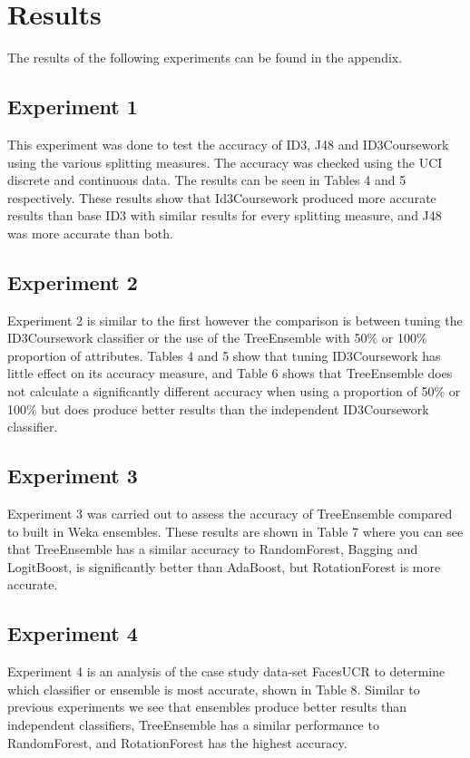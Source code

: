 \documentclass{cmppgr}
\begin{document}
\section {Results} 
The results of the following experiments can be found in the appendix. 

\subsection{Experiment 1}
This experiment was done to test the accuracy of ID3, J48 and ID3Coursework 
using the various splitting measures. The accuracy was checked using the 
UCI discrete and continuous data. The results can be seen in Tables 4 and 5 
respectively. These results show that Id3Coursework produced more accurate 
results than base ID3 with similar results for every splitting measure, 
and J48 was more accurate than both.

\subsection{Experiment 2}
Experiment 2 is similar to the first however the comparison is between 
tuning the ID3Coursework classifier or the use of the TreeEnsemble with 
50\% or 100\% proportion of attributes. 
Tables 4 and 5 show that tuning ID3Coursework has little effect on its 
accuracy measure, and Table 6 shows that TreeEnsemble does not calculate 
a significantly different accuracy when using a proportion of 50\% or 100\% 
but does produce better results than the independent ID3Coursework classifier.

\subsection{Experiment 3}
Experiment 3 was carried out to assess the accuracy of TreeEnsemble compared 
to built in Weka ensembles. These results are shown in Table 7 where you 
can see that TreeEnsemble has a similar accuracy to RandomForest, Bagging and 
LogitBoost, is significantly better than AdaBoost, but RotationForest is 
more accurate.

\subsection{Experiment 4}
Experiment 4 is an analysis of the case study data-set FacesUCR to determine 
which classifier or ensemble is most accurate, shown in Table 8. Similar to 
previous experiments we see that ensembles produce better results than 
independent classifiers, TreeEnsemble has a similar performance to RandomForest, 
and RotationForest has the highest accuracy.
\end{document}
